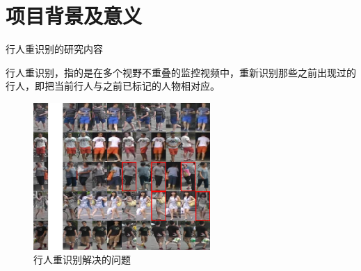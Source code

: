 \section{项目背景及意义}

    \begin{frame}{行人重识别的研究内容}
    \begin{block}{}
    行人重识别，指的是在多个视野不重叠的监控视频中，重新识别那些之前出现过的行人，即把当前行人与之前已标记的人物相对应。
    \end{block}
    \begin{figure}
    \centering
    \includegraphics[width=0.6\textwidth,trim={0 200 0 0},clip=true]{figures/vis3}
    \caption{行人重识别解决的问题}
    \label{fig:reid_intro}
    \end{figure}
    \end{frame}


